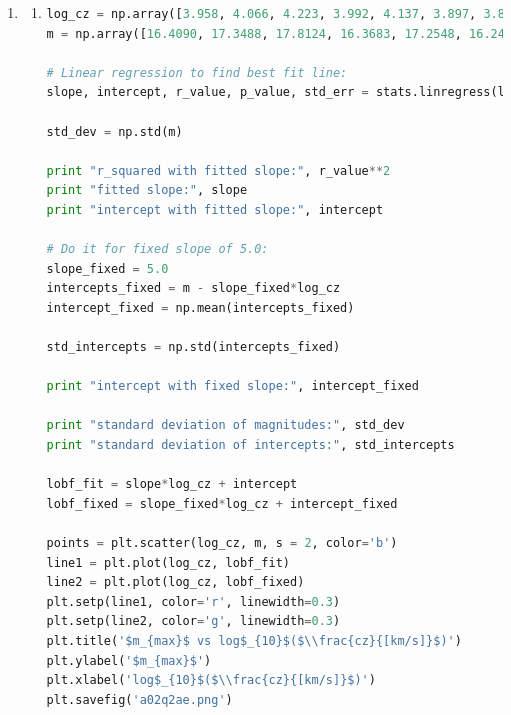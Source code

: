 \documentclass[10pt,letterpaper]{article}
\begin{document}
\begin{enumerate}
\begin{enumerate}
\item 
$M_K = -24.0$\\
$M_{bol} - M_{bol,\odot} = -2.5 log \left(\frac{L}{L_\odot}\right)$\\
$M_{bol} = BC_K - M_K$\\

etc...\\

\item

\end{enumerate}

\item 
\begin{enumerate}

\item

\begin{lstlisting}[language=Python]
log_cz = np.array([3.958, 4.066, 4.223, 3.992, 4.137, 3.897, 3.891, 4.481, 3.774, 4.240, 3.736, 4.326])
m = np.array([16.4090, 17.3488, 17.8124, 16.3683, 17.2548, 16.2426, 16.2164, 19.0955, 15.4026, 17.7777, 15.4329, 18.4524])

# Linear regression to find best fit line:
slope, intercept, r_value, p_value, std_err = stats.linregress(log_cz, m)

std_dev = np.std(m)

print "r_squared with fitted slope:", r_value**2
print "fitted slope:", slope
print "intercept with fitted slope:", intercept

# Do it for fixed slope of 5.0:
slope_fixed = 5.0
intercepts_fixed = m - slope_fixed*log_cz
intercept_fixed = np.mean(intercepts_fixed)

std_intercepts = np.std(intercepts_fixed)

print "intercept with fixed slope:", intercept_fixed

print "standard deviation of magnitudes:", std_dev
print "standard deviation of intercepts:", std_intercepts

lobf_fit = slope*log_cz + intercept
lobf_fixed = slope_fixed*log_cz + intercept_fixed

points = plt.scatter(log_cz, m, s = 2, color='b')
line1 = plt.plot(log_cz, lobf_fit)
line2 = plt.plot(log_cz, lobf_fixed)
plt.setp(line1, color='r', linewidth=0.3)
plt.setp(line2, color='g', linewidth=0.3)
plt.title('$m_{max}$ vs log$_{10}$($\\frac{cz}{[km/s]}$)')
plt.ylabel('$m_{max}$')
plt.xlabel('log$_{10}$($\\frac{cz}{[km/s]}$)')
plt.savefig('a02q2ae.png')
\end{lstlisting}


\end{enumerate}
\end{enumerate}
\end{document}
